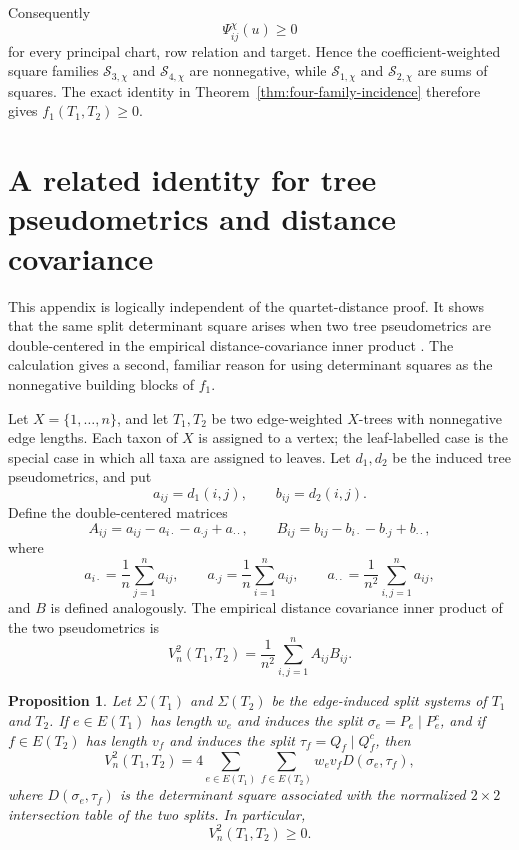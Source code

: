 \documentclass[11pt]{article}
\newtheorem{proposition}[theorem]{Proposition}
\begin{document}
Consequently
\[
\Psi^{\chi}_{ij}(u)\ge0
\]
for every principal chart, row relation and target.  Hence the
coefficient-weighted square families $\mathcal S_{3,\chi}$ and
$\mathcal S_{4,\chi}$ are nonnegative, while
$\mathcal S_{1,\chi}$ and $\mathcal S_{2,\chi}$ are sums of
squares.  The exact identity in Theorem~\ref{thm:four-family-incidence}
therefore gives $f_1(T_1,T_2)\ge0$.



\section{A related identity for tree pseudometrics and distance covariance}\label{app:distance-covariance}

This appendix is logically independent of the quartet-distance proof.  It
shows that the same split determinant square arises when two tree
pseudometrics are double-centered in the empirical distance-covariance inner
product
\cite{SzekelyRizzo2009}.  The calculation gives a second, familiar reason for
using determinant squares as the nonnegative building blocks of $f_1$.

Let $X=\{1,\ldots,n\}$, and let $T_1,T_2$ be two edge-weighted $X$-trees
with nonnegative edge lengths.  Each taxon of $X$ is assigned to a vertex;
the leaf-labelled case is the special case in which all taxa are assigned to
leaves.  Let $d_1,d_2$ be the induced tree pseudometrics, and put
\[
a_{ij}=d_1(i,j),\qquad b_{ij}=d_2(i,j).
\]
Define the double-centered matrices
\[
A_{ij}=a_{ij}-a_{i\cdot}-a_{\cdot j}+a_{\cdot\cdot},
\qquad
B_{ij}=b_{ij}-b_{i\cdot}-b_{\cdot j}+b_{\cdot\cdot},
\]
where
\[
a_{i\cdot}=\frac1n\sum_{j=1}^n a_{ij},\qquad
 a_{\cdot j}=\frac1n\sum_{i=1}^n a_{ij},\qquad
 a_{\cdot\cdot}=\frac1{n^2}\sum_{i,j=1}^n a_{ij},
\]
and $B$ is defined analogously.  The empirical distance covariance inner product of the two pseudometrics is
\[
V_n^2(T_1,T_2)=\frac1{n^2}\sum_{i,j=1}^n A_{ij}B_{ij}.
\]

\begin{proposition}\label{prop:distance-covariance-split}
Let $\Sigma(T_1)$ and $\Sigma(T_2)$ be the edge-induced split systems of $T_1$ and $T_2$.  If $e\in E(T_1)$ has length $w_e$ and induces the split $\sigma_e=P_e\mid P_e^c$, and if $f\in E(T_2)$ has length $v_f$ and induces the split $\tau_f=Q_f\mid Q_f^c$, then
\[
V_n^2(T_1,T_2)
=
4\sum_{e\in E(T_1)}\sum_{f\in E(T_2)}
w_ev_fD(\sigma_e,\tau_f),
\]
where $D(\sigma_e,\tau_f)$ is the determinant square associated with the normalized $2\times2$ intersection table of the two splits.  In particular,
\[
V_n^2(T_1,T_2)\ge0.
\]
\end{proposition}
\end{document}
